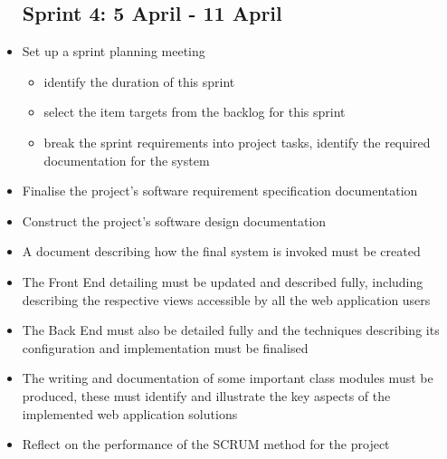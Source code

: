 \documentclass[10pt, a4paper, onecolumn]{scrartcl}
\begin{document}
\begin{itemize}[noitemsep]
		\subsection{Sprint 4: 5 April - 11 April}
				\item Set up a sprint planning meeting
				\begin{itemize}
					\item identify the duration of this sprint
					\item select the item targets from the backlog for this sprint
					\item break the sprint requirements into project tasks, identify the required documentation for the system
				\end{itemize}
				\item Finalise the project's software requirement specification documentation
				\item Construct the project's software design documentation
				\item A document describing how the final system is invoked must be created
				\item The Front End detailing must be updated and described fully, including describing the respective views accessible by all the web application users
				\item The Back End must also be detailed fully and the techniques describing its configuration and implementation must be finalised
				\item The writing and documentation of some important class modules must be produced, these must identify and illustrate the key aspects of the implemented web application solutions
				\item Reflect on the performance of the SCRUM method for the project
			\end{itemize}	
				
				
				

				
			
			
	
	
\end{document}
